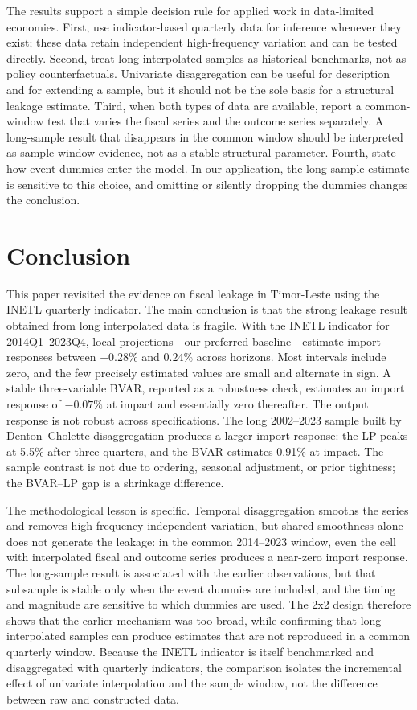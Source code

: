 \documentclass[11pt,a4paper]{article}
\begin{document}
The results support a simple decision rule for applied work in data-limited economies. First, use indicator-based quarterly data for inference whenever they exist; these data retain independent high-frequency variation and can be tested directly. Second, treat long interpolated samples as historical benchmarks, not as policy counterfactuals. Univariate disaggregation can be useful for description and for extending a sample, but it should not be the sole basis for a structural leakage estimate. Third, when both types of data are available, report a common-window test that varies the fiscal series and the outcome series separately. A long-sample result that disappears in the common window should be interpreted as sample-window evidence, not as a stable structural parameter. Fourth, state how event dummies enter the model. In our application, the long-sample estimate is sensitive to this choice, and omitting or silently dropping the dummies changes the conclusion.

\section{Conclusion}
\label{sec:conclusion}

This paper revisited the evidence on fiscal leakage in Timor-Leste using the INETL quarterly indicator. The main conclusion is that the strong leakage result obtained from long interpolated data is fragile. With the INETL indicator for 2014Q1--2023Q4, local projections---our preferred baseline---estimate import responses between $-0.28\%$ and $0.24\%$ across horizons. Most intervals include zero, and the few precisely estimated values are small and alternate in sign. A stable three-variable BVAR, reported as a robustness check, estimates an import response of $-0.07\%$ at impact and essentially zero thereafter. The output response is not robust across specifications. The long 2002--2023 sample built by Denton--Cholette disaggregation produces a larger import response: the LP peaks at 5.5\% after three quarters, and the BVAR estimates 0.91\% at impact. The sample contrast is not due to ordering, seasonal adjustment, or prior tightness; the BVAR--LP gap is a shrinkage difference.

The methodological lesson is specific. Temporal disaggregation smooths the series and removes high-frequency independent variation, but shared smoothness alone does not generate the leakage: in the common 2014--2023 window, even the cell with interpolated fiscal and outcome series produces a near-zero import response. The long-sample result is associated with the earlier observations, but that subsample is stable only when the event dummies are included, and the timing and magnitude are sensitive to which dummies are used. The 2x2 design therefore shows that the earlier mechanism was too broad, while confirming that long interpolated samples can produce estimates that are not reproduced in a common quarterly window. Because the INETL indicator is itself benchmarked and disaggregated with quarterly indicators, the comparison isolates the incremental effect of univariate interpolation and the sample window, not the difference between raw and constructed data.
\end{document}
